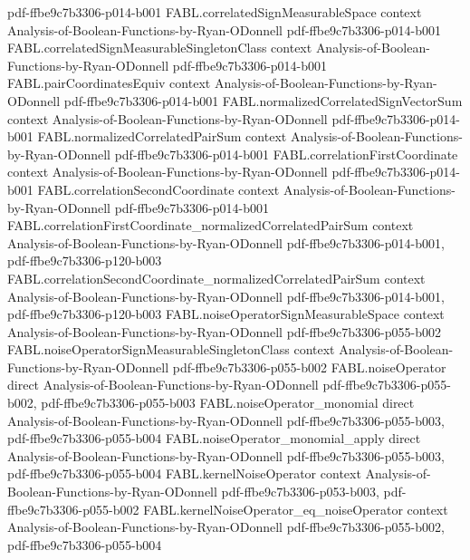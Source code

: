 \begin{theorem}
  {pdf-ffbe9c7b3306-p014-b001}
\proofstep
  {FABL.correlatedSignMeasurableSpace}
  {context}
  {Analysis-of-Boolean-Functions-by-Ryan-ODonnell}
  {pdf-ffbe9c7b3306-p014-b001}
\proofstep
  {FABL.correlatedSignMeasurableSingletonClass}
  {context}
  {Analysis-of-Boolean-Functions-by-Ryan-ODonnell}
  {pdf-ffbe9c7b3306-p014-b001}
\proofstep
  {FABL.pairCoordinatesEquiv}
  {context}
  {Analysis-of-Boolean-Functions-by-Ryan-ODonnell}
  {pdf-ffbe9c7b3306-p014-b001}
\proofstep
  {FABL.normalizedCorrelatedSignVectorSum}
  {context}
  {Analysis-of-Boolean-Functions-by-Ryan-ODonnell}
  {pdf-ffbe9c7b3306-p014-b001}
\proofstep
  {FABL.normalizedCorrelatedPairSum}
  {context}
  {Analysis-of-Boolean-Functions-by-Ryan-ODonnell}
  {pdf-ffbe9c7b3306-p014-b001}
\proofstep
  {FABL.correlationFirstCoordinate}
  {context}
  {Analysis-of-Boolean-Functions-by-Ryan-ODonnell}
  {pdf-ffbe9c7b3306-p014-b001}
\proofstep
  {FABL.correlationSecondCoordinate}
  {context}
  {Analysis-of-Boolean-Functions-by-Ryan-ODonnell}
  {pdf-ffbe9c7b3306-p014-b001}
\proofstep
  {FABL.correlationFirstCoordinate_normalizedCorrelatedPairSum}
  {context}
  {Analysis-of-Boolean-Functions-by-Ryan-ODonnell}
  {pdf-ffbe9c7b3306-p014-b001,
    pdf-ffbe9c7b3306-p120-b003}
\proofstep
  {FABL.correlationSecondCoordinate_normalizedCorrelatedPairSum}
  {context}
  {Analysis-of-Boolean-Functions-by-Ryan-ODonnell}
  {pdf-ffbe9c7b3306-p014-b001,
    pdf-ffbe9c7b3306-p120-b003}
\proofstep
  {FABL.noiseOperatorSignMeasurableSpace}
  {context}
  {Analysis-of-Boolean-Functions-by-Ryan-ODonnell}
  {pdf-ffbe9c7b3306-p055-b002}
\proofstep
  {FABL.noiseOperatorSignMeasurableSingletonClass}
  {context}
  {Analysis-of-Boolean-Functions-by-Ryan-ODonnell}
  {pdf-ffbe9c7b3306-p055-b002}
\proofstep
  {FABL.noiseOperator}
  {direct}
  {Analysis-of-Boolean-Functions-by-Ryan-ODonnell}
  {pdf-ffbe9c7b3306-p055-b002,
    pdf-ffbe9c7b3306-p055-b003}
\proofstep
  {FABL.noiseOperator_monomial}
  {direct}
  {Analysis-of-Boolean-Functions-by-Ryan-ODonnell}
  {pdf-ffbe9c7b3306-p055-b003,
    pdf-ffbe9c7b3306-p055-b004}
\proofstep
  {FABL.noiseOperator_monomial_apply}
  {direct}
  {Analysis-of-Boolean-Functions-by-Ryan-ODonnell}
  {pdf-ffbe9c7b3306-p055-b003,
    pdf-ffbe9c7b3306-p055-b004}
\proofstep
  {FABL.kernelNoiseOperator}
  {context}
  {Analysis-of-Boolean-Functions-by-Ryan-ODonnell}
  {pdf-ffbe9c7b3306-p053-b003,
    pdf-ffbe9c7b3306-p055-b002}
\proofstep
  {FABL.kernelNoiseOperator_eq_noiseOperator}
  {context}
  {Analysis-of-Boolean-Functions-by-Ryan-ODonnell}
  {pdf-ffbe9c7b3306-p055-b002,
    pdf-ffbe9c7b3306-p055-b004}
\proofstep

\end{theorem}
